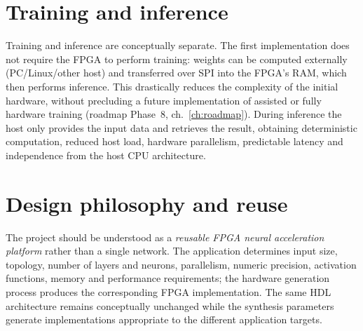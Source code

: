 \section{Training and inference}
Training and inference are conceptually separate. The first implementation does not
require the FPGA to perform training: weights can be computed externally
(PC/Linux/other host) and transferred over SPI into the FPGA's RAM, which then performs
inference. This drastically reduces the complexity of the initial hardware, without
precluding a future implementation of assisted or fully hardware training (roadmap
Phase~8, ch.~\ref{ch:roadmap}). During inference the host only provides the input data
and retrieves the result, obtaining deterministic computation, reduced host load,
hardware parallelism, predictable latency and independence from the host CPU
architecture.

\section{Design philosophy and reuse}
The project should be understood as a \emph{reusable FPGA neural acceleration platform}
rather than a single network. The application determines input size, topology, number
of layers and neurons, parallelism, numeric precision, activation functions, memory and
performance requirements; the hardware generation process produces the corresponding
FPGA implementation. The same HDL architecture remains conceptually unchanged while the
synthesis parameters generate implementations appropriate to the different application
targets.
